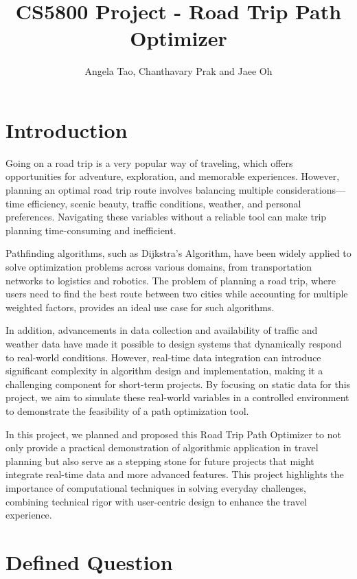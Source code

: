 \documentclass{article}
\title{CS5800 Project - Road Trip Path Optimizer}
\author{Angela Tao, Chanthavary Prak and Jaee Oh}
\begin{document}
\maketitle

\section{Introduction}

Going on a road trip is a very popular way of traveling, which offers opportunities for adventure, exploration, and memorable experiences. However, planning an optimal road trip route involves balancing multiple considerations—time efficiency, scenic beauty, traffic conditions, weather, and personal preferences. Navigating these variables without a reliable tool can make trip planning time-consuming and inefficient.

Pathfinding algorithms, such as Dijkstra’s Algorithm, have been widely applied to solve optimization problems across various domains, from transportation networks to logistics and robotics. The problem of planning a road trip, where users need to find the best route between two cities while accounting for multiple weighted factors, provides an ideal use case for such algorithms.

In addition, advancements in data collection and availability of traffic and weather data have made it possible to design systems that dynamically respond to real-world conditions. However, real-time data integration can introduce significant complexity in algorithm design and implementation, making it a challenging component for short-term projects. By focusing on static data for this project, we aim to simulate these real-world variables in a controlled environment to demonstrate the feasibility of a path optimization tool.

In this project, we planned and proposed this Road Trip Path Optimizer to not only provide a practical demonstration of algorithmic application in travel planning but also serve as a stepping stone for future projects that might integrate real-time data and more advanced features. This project highlights the importance of computational techniques in solving everyday challenges, combining technical rigor with user-centric design to enhance the travel experience.

\newpage
\section{Defined Question}
\end{document}
